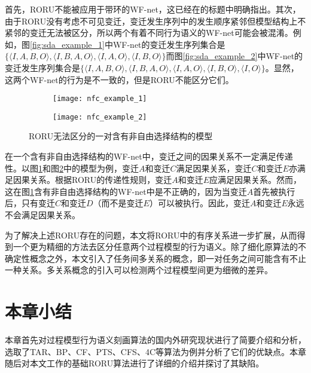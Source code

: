 首先，RORU不能被应用于带环的WF-net，这已经在的标题中明确指出。其次，由于RORU没有考虑不可见变迁，变迁发生序列中的发生顺序紧邻但模型结构上不紧邻的变迁无法被区分，所以两个有着不同行为语义的WF-net可能会被混淆。例如，图\ref{fig:sda_example_1}中WF-net的变迁发生序列集合是$\{\langle I,A,B,O\rangle,\langle I,B,A,O\rangle,\langle I,A,O\rangle,\langle I,B,O\rangle\}$而图\ref{fig:sda_example_2}中WF-net的变迁发生序列集合是$\{\langle I,A,B,O\rangle,\langle I,B,A,O\rangle,\langle I,A,O\rangle,\langle I,B,O\rangle,\langle I,O\rangle\}$。显然，这两个WF-net的行为是不一致的，但是RORU不能区分它们。

\begin{figure}[htbp]
  \centering
  \begin{subfigure}{1\textwidth}
    \centering
    \texttt{[image: nfc\_example\_1]}
    \caption{\label{fig:nfc_example_1}}
  \end{subfigure}
  \begin{subfigure}{1\textwidth}
    \vspace{1em}
    \centering
    \texttt{[image: nfc\_example\_2]}
    \caption{\label{fig:nfc_example_2}}
  \end{subfigure}
  \caption{RORU无法区分的一对含有非自由选择结构的模型}
  \label{fig:nfc_example}
\end{figure}

在一个含有非自由选择结构\cite{de2003workflow}的WF-net中，变迁之间的因果关系不一定满足传递性。以图\ref{fig:nfc_example_1}和图\ref{fig:nfc_example_2}中的模型为例，变迁$A$和变迁$C$满足因果关系，变迁$C$和变迁$E$亦满足因果关系。根据RORU的传递性规则，变迁$A$和变迁$E$应满足因果关系。然而，这在图\ref{fig:nfc_example_1}含有非自由选择结构的WF-net中是不正确的，因为当变迁$A$首先被执行后，只有变迁$C$和变迁$D$（而不是变迁$E$）可以被执行。因此，变迁$A$和变迁$E$永远不会满足因果关系。

为了解决上述RORU存在的问题，本文将RORU中的有序关系进一步扩展，从而得到一个更为精细的方法去区分任意两个过程模型的行为语义。除了细化原算法的不确定性概念之外，本文引入了任务间多关系的概念，即一对任务之间可能含有不止一种关系。多关系概念的引入可以检测两个过程模型间更为细微的差异。

\section{本章小结}
本章首先对过程模型行为语义刻画算法的国内外研究现状进行了简要介绍和分析，选取了TAR、BP、CF、PTS、CFS、4C等算法为例并分析了它们的优缺点。本章随后对本文工作的基础RORU算法进行了详细的介绍并探讨了其缺陷。
